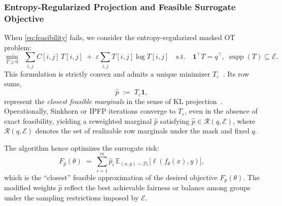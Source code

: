\documentclass[9pt]{extarticle}
\theoremstyle{definition}
\renewcommand{\paragraph}[1]{\par\medskip\noindent{\bf #1}\hspace{0.5em}\ignorespaces}
\begin{document}
\subsubsection{Entropy-Regularized Projection and Feasible Surrogate Objective}
When \eqref{eq:feasibility} fails, we consider the entropy-regularized masked OT problem:
\begin{equation}\label{eq:entropic-mot-failure}
\min_{T\ge 0}\;\;\sum_{i,j} C[i,j]\,T[i,j] \;+\; \varepsilon \sum_{i,j} T[i,j]\log T[i,j]
\quad\text{s.t.}\quad \mathbf{1}^\top T=q^\top,\;\operatorname{supp}(T)\subseteq\mathcal{E}.
\end{equation}
This formulation is strictly convex and admits a unique minimizer $T_\varepsilon$~\cite{cuturi2013sinkhorn,peyre2019computational}.
Its row sums,
\begin{equation}\label{eq:phat-failure}
\hat{p} \;:=\; T_\varepsilon \mathbf{1},
\end{equation}
represent the \emph{closest feasible marginals} in the sense of KL projection~\cite{csiszar1975ipr}.
Operationally, Sinkhorn or IPFP iterations converge to $T_\varepsilon$, even in the absence of exact feasibility, yielding a reweighted marginal $\hat{p}$ satisfying $\hat{p}\in\mathcal{R}(q,\mathcal{E})$, where $\mathcal{R}(q,\mathcal{E})$ denotes the set of realizable row marginals under the mask and fixed $q$.
\paragraph{Interpretation.}
The algorithm hence optimizes the surrogate risk:
\begin{equation}\label{eq:surrogate-objective-failure}
F_{\hat{p}}(\theta) \;=\; \sum_{i=1}^m \hat{p}_i\,\mathbb{E}_{(x,y)\sim \mathcal{D}_i}\big[\ell(f_\theta(x),y)\big],
\end{equation}
which is the “closest” feasible approximation of the desired objective $F_p(\theta)$.
The modified weights $\hat{p}$ reflect the best achievable fairness or balance among groups under the sampling restrictions imposed by $\mathcal{E}$.
\end{document}
